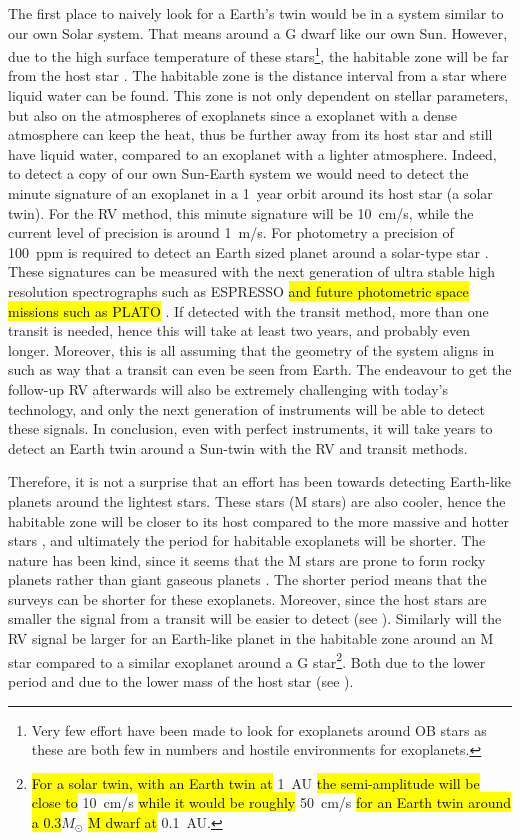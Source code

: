 The first place to naively look for a Earth's twin would be in a system similar to our own Solar
system. That means around a G dwarf like our own Sun. However, due to the high surface temperature
of these stars\footnote{Very few effort have been made to look for exoplanets around OB stars as
these are both few in numbers and hostile environments for exoplanets.}, the habitable zone will be
far from the host star \citep[see e.g.][]{Kasting1993}. The habitable zone is the distance interval
from a star where liquid water can be found. This zone is not only dependent on stellar parameters,
but also on the atmospheres of exoplanets since a exoplanet with a dense atmosphere can keep the
heat, thus be further away from its host star and still have liquid water, compared to an exoplanet
with a lighter atmosphere. Indeed, to detect a copy of our own Sun-Earth system we would need to
detect the minute signature of an exoplanet in a \SI{1}{year} orbit around its host star (a solar
twin). For the RV method, this minute signature will be \SI{10}{cm/s}, while the current level of
precision is around \SI{1}{m/s}. For photometry a precision of \SI{100}{ppm} is required to detect
an Earth sized planet around a solar-type star \citep{Borucki2017}. These signatures can be measured
with the next generation of ultra stable high resolution spectrographs such as ESPRESSO
\citep{ESPRESSO} \hl{and future photometric space missions such as PLATO} \citep{PLATO}. If detected
with the transit method, more than one transit is needed, hence this will take at least two years,
and probably even longer. Moreover, this is all assuming that the geometry of the system aligns in
such as way that a transit can even be seen from Earth. The endeavour to get the follow-up RV
afterwards will also be extremely challenging with today's technology, and only the next generation
of instruments will be able to detect these signals. In conclusion, even with perfect instruments,
it will take years to detect an Earth twin around a Sun-twin with the RV and transit methods.

Therefore, it is not a surprise that an effort has been towards detecting Earth-like planets around
the lightest stars. These stars (M stars) are also cooler, hence the habitable zone will be closer
to its host compared to the more massive and hotter stars \citep{Kasting1997}, and ultimately the
period for habitable exoplanets will be shorter. The nature has been kind, since it seems that the M
stars are prone to form rocky planets rather than giant gaseous planets
\citep{Bonfils2013,Delfosse2013}. The shorter period means that the surveys can be shorter for these
exoplanets. Moreover, since the host stars are smaller the signal from a transit will be easier to
detect (see ). Similarly will the RV signal be larger for an Earth-like planet in
the habitable zone around an M star compared to a similar exoplanet around a G star\footnote{\hl{
For a solar twin, with an Earth twin at} \SI{1}{AU} \hl{the semi-amplitude will be close to}
\SI{10}{cm/s} \hl{while it would be roughly} \SI{50}{cm/s} \hl{for an Earth twin around a
0.3}$M_\odot$ \hl{M dwarf at} \SI{0.1}{AU}.}. Both due to the lower period and due to the lower mass
of the host star (see ).

